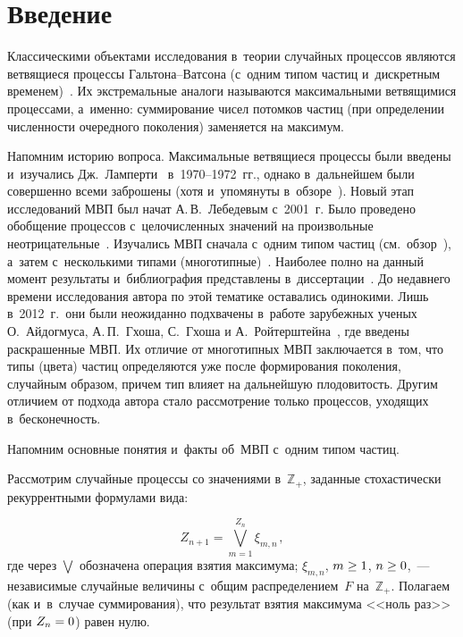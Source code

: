 \thispagestyle{headings}

\begin{multicols}{2}

\label{st\stat}

\section{Введение}

Классическими объектами исследования в~тео\-рии случайных процессов
являются ветвящиеся процессы Галь\-то\-на--Ват\-со\-на
(с~одним типом час\-тиц и~дискретным временем)~\cite{Har}.
Их экстремальные аналоги называются максимальными
ветвящимися процессами, а~именно: суммирование чисел потомков час\-тиц
(при определении чис\-лен\-ности очередного поколения) заменяется на максимум.

Напомним историю вопроса.
Максимальные вет\-вя\-щи\-еся процессы были введены и~изучались Дж.~Ламперти~\cite{Lamp1, Lamp2} в~1970--1972~гг., 
однако в~дальнейшем были совершенно всеми за\-бро\-ше\-ны 
(хотя и~упомянуты в~обзоре~\cite{VatZub2}).
Новый этап исследований МВП был начат А.\,В.~Лебедевым с~2001~г. Было проведено
обобщение процессов с~це\-ло\-чис\-лен\-ных значений на произвольные 
не\-от\-ри\-ца\-тель\-ные~\cite{Leb-2005d}.
Изучались МВП сначала с~одним типом час\-тиц (см.\ обзор~\cite{Leb-2009a}), 
а~затем с~несколькими типами
(многотипные)~\cite{Leb-2012a}. Наиболее пол\-но на данный момент 
результаты и~биб\-лио\-гра\-фия
пред\-став\-ле\-ны в~диссертации~\cite[гл.~4 и~5]{LebDiss}. 
До недавнего времени исследования автора 
по этой тематике оставались одинокими.
Лишь в~2012~г.\ они были неожиданно подхвачены в~работе зарубежных ученых
О.~Айдогмуса, А.\,П.~Гхоша, С.~Гхоша
и А.~Ройтерштейна~\cite{CMBP}, где введены раскрашенные 
МВП. Их отличие от многотипных МВП заключается в~том, что типы (цвета) час\-тиц определяются уже после
формирования поколения, случайным образом, причем тип влияет на дальнейшую пло\-до\-ви\-тость. Другим
отличием от подхода автора стало рас\-смот\-ре\-ние только процессов, уходящих в~бес\-ко\-неч\-ность.

Напомним основные понятия и~факты об~МВП с~одним типом час\-тиц.

Рассмотрим случайные процессы со значениями в~$\mathbb{Z}_+$,
заданные стохастически рекуррентными формулами вида:

\noindent
\begin{equation}
\label{f1-41}
Z_{n+1}=\bigvee_{m=1}^{Z_n}\xi_{m,n\,},
\end{equation}
где через $\bigvee$ обозначена операция взятия максимума; $\xi_{m,n}$,
$m\hm\ge 1$, $n\hm\ge 0$,~---
независимые случайные величины с~общим распределением~$F$ на~$\mathbb{Z}_+$.
Полагаем (как и~в~случае суммирования), что результат взятия максимума
<<ноль раз>> (при $Z_n\hm=0$) равен нулю.


\end{multicols}
